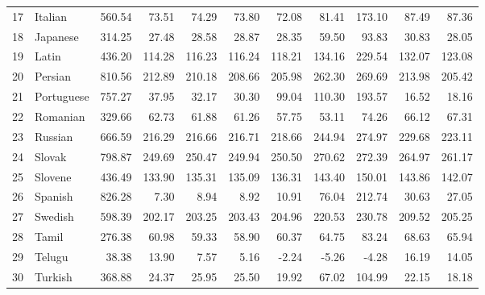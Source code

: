 \documentclass[a4paper]{article}
\begin{document}
\begin{table}
\begin{tabular}{rlrrrrrrrrr}
		17 & Italian & 560.54 & 73.51 & 74.29 & 73.80 & 72.08 & 81.41 & 173.10 & 87.49 & 87.36 \\ 
		18 & Japanese & 314.25 & 27.48 & 28.58 & 28.87 & 28.35 & 59.50 & 93.83 & 30.83 & 28.05 \\ 
		19 & Latin & 436.20 & 114.28 & 116.23 & 116.24 & 118.21 & 134.16 & 229.54 & 132.07 & 123.08 \\ 
		20 & Persian & 810.56 & 212.89 & 210.18 & 208.66 & 205.98 & 262.30 & 269.69 & 213.98 & 205.42 \\ 
		21 & Portuguese & 757.27 & 37.95 & 32.17 & 30.30 & 99.04 & 110.30 & 193.57 & 16.52 & 18.16 \\ 
		22 & Romanian & 329.66 & 62.73 & 61.88 & 61.26 & 57.75 & 53.11 & 74.26 & 66.12 & 67.31 \\ 
		23 & Russian & 666.59 & 216.29 & 216.66 & 216.71 & 218.66 & 244.94 & 274.97 & 229.68 & 223.11 \\ 
		24 & Slovak & 798.87 & 249.69 & 250.47 & 249.94 & 250.50 & 270.62 & 272.39 & 264.97 & 261.17 \\ 
		25 & Slovene & 436.49 & 133.90 & 135.31 & 135.09 & 136.31 & 143.40 & 150.01 & 143.86 & 142.07 \\ 
		26 & Spanish & 826.28 & 7.30 & 8.94 & 8.92 & 10.91 & 76.04 & 212.74 & 30.63 & 27.05 \\ 
		27 & Swedish & 598.39 & 202.17 & 203.25 & 203.43 & 204.96 & 220.53 & 230.78 & 209.52 & 205.25 \\ 
		28 & Tamil & 276.38 & 60.98 & 59.33 & 58.90 & 60.37 & 64.75 & 83.24 & 68.63 & 65.94 \\ 
		29 & Telugu & 38.38 & 13.90 & 7.57 & 5.16 & -2.24 & -5.26 & -4.28 & 16.19 & 14.05 \\ 
		30 & Turkish & 368.88 & 24.37 & 25.95 & 25.50 & 19.92 & 67.02 & 104.99 & 22.15 & 18.18 \\ 
		\hline
	\end{tabular}
\end{table}
\pagestyle{plain}



\end{document}
